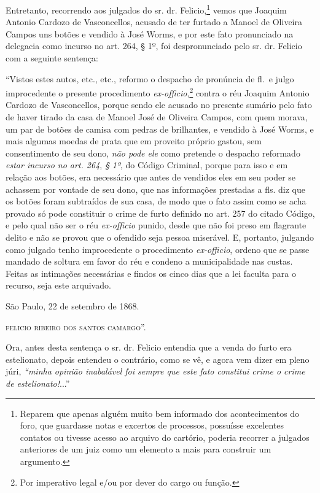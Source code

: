 {Entretanto, recorrendo aos julgados do sr. dr. Felicio,\footnote{
  Reparem que apenas alguém muito bem informado dos acontecimentos do
  foro, que guardasse notas e excertos de processos, possuísse
  excelentes contatos ou tivesse acesso ao arquivo do cartório, poderia
  recorrer a julgados anteriores de um juiz como um elemento a mais para
  construir um argumento.} vemos que Joaquim Antonio Cardozo de
Vasconcellos, acusado de ter furtado a Manoel de Oliveira Campos uns
botões e vendido à José Worms, e por este fato pronunciado na delegacia
como incurso no art. 264, § 1º, foi despronunciado pelo sr. dr. Felicio
com a seguinte sentença:

``Vistos estes autos, etc., etc., reformo o despacho de pronúncia de
fl.~e julgo improcedente o presente procedimento
\emph{ex-officio},\footnote{ Por imperativo legal e/ou por dever do
  cargo ou função.} contra o réu Joaquim Antonio Cardozo de
Vasconcellos, porque sendo ele acusado no presente sumário pelo fato de
haver tirado da casa de Manoel José de Oliveira Campos, com quem morava,
um par de botões de camisa com pedras de brilhantes, e vendido à José
Worms, e mais algumas moedas de prata que em proveito próprio gastou,
sem consentimento de seu dono, \emph{não pode ele} como pretende o
despacho reformado \emph{estar incurso no art. 264}, \emph{§ 1º}, do
Código Criminal, porque para isso e em relação aos botões, era
necessário que antes de vendidos eles em seu poder se achassem por
vontade de seu dono, que nas informações prestadas a fls. diz que os
botões foram subtraídos de sua casa, de modo que o fato assim como se
acha provado só pode constituir o crime de furto definido no art. 257 do
citado Código, e pelo qual não ser o réu \emph{ex-officio} punido, desde
que não foi preso em flagrante delito e não se provou que o ofendido
seja pessoa miserável. E, portanto, julgando como julgado tenho
improcedente o procedimento \emph{ex-officio}, ordeno que se passe
mandado de soltura em favor do réu e condeno a municipalidade nas
custas. Feitas as intimações necessárias e findos os cinco dias que a
lei faculta para o recurso, seja este arquivado.
\begin{flushright}
São Paulo, 22 de setembro de 1868.

\textsc{felicio ribeiro dos santos camargo}''.
\end{flushright}

Ora, antes desta sentença o sr. dr. Felicio entendia que a venda do
furto era estelionato, depois entendeu o contrário, como se vê, e agora
vem dizer em pleno júri, \emph{``minha opinião inabalável foi sempre que
este fato constitui crime o crime de estelionato!}...''

}
